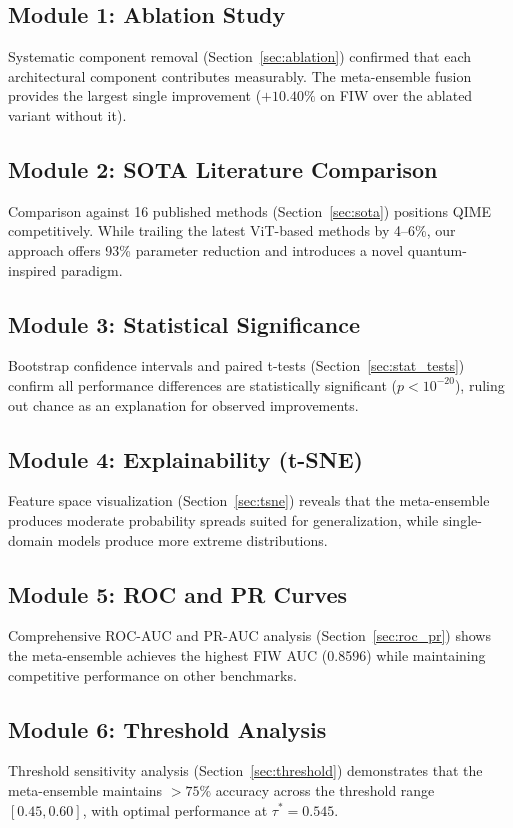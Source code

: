 \documentclass[journal,12pt]{IEEEtran}
\begin{document}
\subsection{Module 1: Ablation Study}
Systematic component removal (Section~\ref{sec:ablation}) confirmed that
each architectural component contributes measurably. The meta-ensemble
fusion provides the largest single improvement ($+10.40\%$ on FIW over
the ablated variant without it).

\subsection{Module 2: SOTA Literature Comparison}
Comparison against 16 published methods (Section~\ref{sec:sota})
positions QIME competitively. While trailing the latest ViT-based
methods by 4--6\%, our approach offers 93\% parameter reduction and
introduces a novel quantum-inspired paradigm.

\subsection{Module 3: Statistical Significance}
Bootstrap confidence intervals and paired t-tests
(Section~\ref{sec:stat_tests}) confirm all performance differences are
statistically significant ($p < 10^{-20}$), ruling out chance as an
explanation for observed improvements.

\subsection{Module 4: Explainability (t-SNE)}
Feature space visualization (Section~\ref{sec:tsne}) reveals that the
meta-ensemble produces moderate probability spreads suited for
generalization, while single-domain models produce more extreme
distributions.

\subsection{Module 5: ROC and PR Curves}
Comprehensive ROC-AUC and PR-AUC analysis (Section~\ref{sec:roc_pr})
shows the meta-ensemble achieves the highest FIW AUC (0.8596) while
maintaining competitive performance on other benchmarks.

\subsection{Module 6: Threshold Analysis}
Threshold sensitivity analysis (Section~\ref{sec:threshold}) demonstrates
that the meta-ensemble maintains $>75\%$ accuracy across the threshold
range $[0.45, 0.60]$, with optimal performance at $\tau^* = 0.545$.
\end{document}
